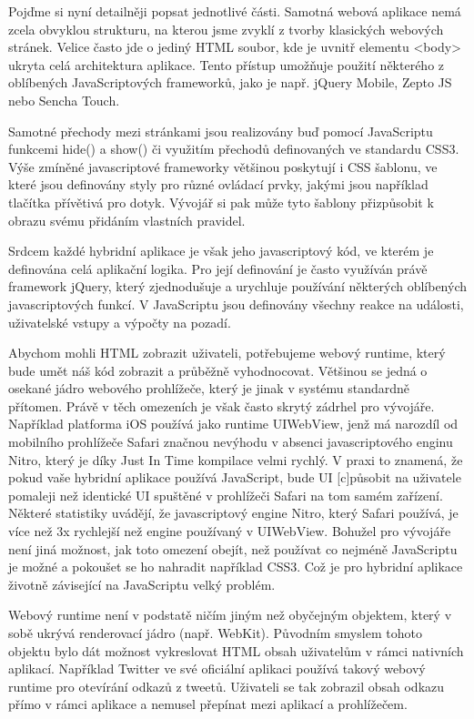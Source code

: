 Pojďme si nyní detailněji popsat jednotlivé části. Samotná webová aplikace nemá zcela obvyklou strukturu, na kterou jsme zvyklí z tvorby klasických webových stránek. Velice často jde o jediný HTML soubor, kde je uvnitř elementu <body> ukryta celá architektura aplikace. Tento přístup umožňuje použití některého z oblíbených JavaScriptových frameworků, jako je např. jQuery Mobile, Zepto JS nebo Sencha Touch.

Samotné přechody mezi stránkami jsou realizovány buď pomocí JavaScriptu funkcemi hide() a show() či využitím přechodů definovaných ve standardu CSS3. Výše zmíněné javascriptové frameworky většinou poskytují i CSS šablonu, ve které jsou definovány styly pro různé ovládací prvky, jakými jsou například tlačítka přívětivá pro dotyk. Vývojář si pak může tyto šablony přizpůsobit k obrazu svému přidáním vlastních pravidel.

Srdcem každé hybridní aplikace je však jeho javascriptový kód, ve kterém je definována celá aplikační logika. Pro její definování je často využíván právě framework jQuery, který zjednodušuje a urychluje používání některých oblíbených javascriptových funkcí. V JavaScriptu jsou definovány všechny reakce na události, uživatelské vstupy a výpočty na pozadí.

Abychom mohli HTML zobrazit uživateli, potřebujeme webový runtime, který bude umět náš kód zobrazit a průběžně vyhodnocovat. Většinou se jedná o osekané jádro webového prohlížeče, který je jinak v systému standardně přítomen. Právě v těch omezeních je však často skrytý zádrhel pro vývojáře. Například platforma iOS používá jako runtime UIWebView, jenž má narozdíl od mobilního prohlížeče Safari značnou nevýhodu v absenci javascriptového enginu Nitro, který je díky Just In Time kompilace velmi rychlý. V praxi to znamená, že pokud vaše hybridní aplikace používá JavaScript, bude UI [c]působit na uživatele pomaleji než identické UI spuštěné v prohlížeči Safari na tom samém zařízení. \cite{primer_on_hybrid_apps} Některé statistiky uvádějí, že javascriptový engine Nitro, který Safari používá, je více než 3x rychlejší než engine používaný v UIWebView. \cite{ios_for_html5_developer} Bohužel pro vývojáře není jiná možnost, jak toto omezení obejít, než používat co nejméně JavaScriptu je možné a pokoušet se ho nahradit například CSS3. Což je pro hybridní aplikace životně závisející na JavaScriptu velký problém.

Webový runtime není v podstatě ničím jiným než obyčejným objektem, který v sobě ukrývá renderovací jádro (např. WebKit). Původním smyslem tohoto objektu bylo dát možnost vykreslovat HTML obsah uživatelům v rámci nativních aplikací. Například Twitter ve své oficiální aplikaci používá takový webový runtime pro otevírání odkazů z tweetů. Uživateli se tak zobrazil obsah odkazu přímo v rámci aplikace a nemusel přepínat mezi aplikací a prohlížečem.

